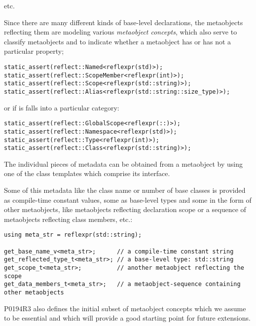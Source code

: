 etc.

Since there are many different kinds of
base-level declarations, the metaobjects reflecting them are
modeling various {\em metaobject concepts}, which also serve to classify
metaobjects and to indicate whether a metaobject has or has not a particular
property;

\begin{verbatim}
static_assert(reflect::Named<reflexpr(std)>);
static_assert(reflect::ScopeMember<reflexpr(int)>);
static_assert(reflect::Scope<reflexpr(std::string)>);
static_assert(reflect::Alias<reflexpr(std::string::size_type)>);
\end{verbatim}

or if is falls into a particular category:

\begin{verbatim}
static_assert(reflect::GlobalScope<reflexpr(::)>);
static_assert(reflect::Namespace<reflexpr(std)>);
static_assert(reflect::Type<reflexpr(int)>);
static_assert(reflect::Class<reflexpr(std::string)>);
\end{verbatim}

The individual pieces of metadata can be obtained from a metaobject by using one
of the class templates which comprise its interface.

Some of this metadata like the class name or number of base classes is provided
as compile-time constant values, some as base-level types
and some in the form of other metaobjects, like metaobjects
reflecting declaration scope or a sequence of metaobjects reflecting class members,
etc.:

\begin{verbatim}
using meta_str = reflexpr(std::string);

get_base_name_v<meta_str>;      // a compile-time constant string
get_reflected_type_t<meta_str>; // a base-level type: std::string
get_scope_t<meta_str>;          // another metaobject reflecting the scope
get_data_members_t<meta_str>;   // a metaobject-sequence containing other metaobjects
\end{verbatim}

P0194R3 also defines the initial subset
of metaobject concepts which we assume to be essential
and which will provide a good starting point for future extensions.

